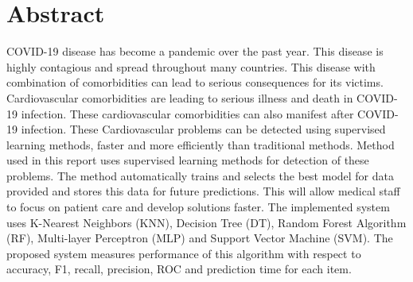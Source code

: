 \section*{\centering Abstract}

COVID-19 disease has become a pandemic over the past year. This disease is highly contagious and
spread throughout many countries. This disease with combination of comorbidities can lead to serious
consequences for its victims. Cardiovascular comorbidities are leading to serious illness and death
in COVID-19 infection. These cardiovascular comorbidities can also manifest after COVID-19 infection.
These Cardiovascular problems can be detected using supervised learning methods, faster and more
efficiently than traditional methods. Method used in this report uses supervised learning methods for
detection of these problems. The method automatically trains and selects the best model for data
provided and stores this data for future predictions. This will allow medical staff to focus on
patient care and develop solutions faster. The implemented system uses  K-Nearest Neighbors (KNN),
Decision Tree (DT), Random Forest Algorithm (RF), Multi-layer Perceptron (MLP) and Support Vector
Machine (SVM). The proposed system measures performance of this algorithm with respect to accuracy,
F1, recall, precision, ROC and prediction time for each item.